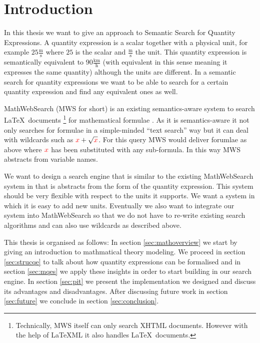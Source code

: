 \section{Introduction}

In this thesis we want to give an approach to Semantic Search for Quantity Expressions. A quantity expression is a scalar together with a physical unit, for example $25 \frac{\text{m}}{\text{s}}$ where $25$ is the scalar and $\frac{\text{m}}{\text{s}}$ the unit. This quantity expression is semantically equivalent to $90 \frac{\text{km}}{\text{h}}$ (with equivalent in this sense meaning it expresses the same quantity) although the units are different. In a semantic search for quantity expressions we want to be able to search for a certain quantity expression and find any equivalent ones as well.

MathWebSearch (MWS for short) is an existing semantics-aware system to search \LaTeX \  documents \footnote{Technically, MWS itself can only search XHTML documents. However with the help of \LaTeX{}ML \cite{Miller:latexml:base} it also handles \LaTeX \ documents. } for mathematical formulae \cite{HamKohPro:man14}. As it is semantics-aware it not only searches for formulae in a simple-minded ``text search'' way but it can deal with wildcards such as $ { \color{red} x} + \sqrt{\color{red} x}$. For this query MWS would deliver forumlae as above where $ { \color{red} x} $ has been substituted with any sub-formula. In this way MWS abstracts from variable names.

We want to design a search engine that is similar to the existing MathWebSearch system in that is abstracts from the form of the quantity expression. This system should be very flexible with respect to the units it supports. We want a system in which it is easy to add new units. Eventually we also want to integrate our system into MathWebSearch so that we do not have to re-write existing search algorithms and can also use wildcards as described above.

This thesis is organised as follows: In section \ref{sec:mathoverview} we start by giving an introduction to mathmatical theory modeling. We proceed in section \ref{sec:strucqe} to talk about how quantity expressions can be formalised and in section \ref{sec:mqes} we apply these insights in order to start building in our search engine. In section \ref{sec:pit} we present the implementation we designed and discuss its advantages and disadvantages. After discussing future work in section \ref{sec:future} we conclude in section \ref{sec:conclusion}. 
